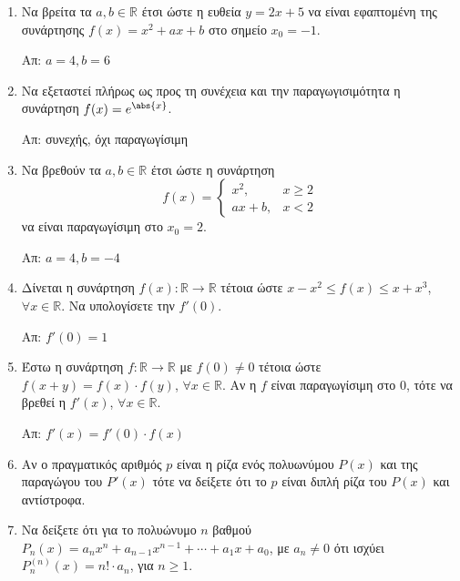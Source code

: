 






\begin{center}
\end{center}

\vspace{\baselineskip}

\begin{enumerate}
	\item Να βρείτα τα $ a, b \in \mathbb{R} $ έτσι ώστε η ευθεία $ y = 2x + 5
		$ να είναι εφαπτομένη της συνάρτησης $ f(x) = x^{2} + ax + b $ στο
		σημείο $ x_{0} = -1 $. 

		\hfill Απ: $ a = 4, b = 6 $

	\item Να εξεταστεί πλήρως ως προς τη συνέχεια και την παραγωγισιμότητα η
		συνάρτηση $ f(x) = e^{\abs{x}} $.

		\hfill Απ: συνεχής, όχι παραγωγίσιμη 

	\item Να βρεθούν τα $ a, b \in \mathbb{R} $ έτσι ώστε η συνάρτηση 
		\[
			f(x) = \begin{cases}
				x^{2}, & x\geq 2 \\
				ax+b , & x<2
			\end{cases}
		\]
		να είναι παραγωγίσιμη στο $ x_{0} = 2 $.

		\hfill Απ: $ a=4, b=-4 $

	\item Δίνεται η συνάρτηση $ f(x) \colon \mathbb{R} \to \mathbb{R} $ τέτοια
		ώστε $ x - x^{2} \leq f(x) \leq x + x^{3} $, $ \forall x \in \mathbb{R}
		$. Να υπολογίσετε την $ f'(0) $.

		\hfill Απ: $ f'(0) = 1 $

	\item Έστω η συνάρτηση $ f \colon \mathbb{R} \to \mathbb{R} $ με $ f(0)
		\neq 0	$ τέτοια ώστε $ f(x+y) = f(x) \cdot f(y) $, $ \forall x \in
		\mathbb{R} $. Αν η $f$ είναι παραγωγίσιμη στο $0$, τότε να βρεθεί η $
		f'(x) $, $ \forall x \in \mathbb{R} $.

		\hfill Απ: $ f'(x) = f'(0)\cdot f(x) $

	\item Αν ο πραγματικός αριθμός $p$ είναι η ρίζα ενός πολυωνύμου $ P(x)
		$ και της παραγώγου του $ P'(x) $ τότε να δείξετε ότι το $p$ είναι διπλή
		ρίζα του $ P(x) $ και αντίστροφα.

	\item Να δείξετε ότι για το πολυώνυμο $n$ βαθμού $ P_{n}(x) =a_{n}x^{n} +
		a_{n-1}x^{n-1} + \cdots + a_{1}x + a_{0} $, με  $ a_{n}\neq 0 $ ότι ισχύει $
		P_{n}^{(n)}(x) = n! \cdot a_{n}$, για  $n\geq 1 $.
\end{enumerate}


